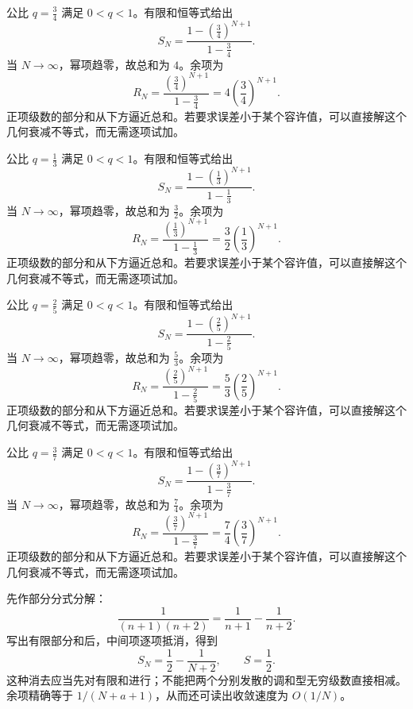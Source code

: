\documentclass[UTF8,12pt,a4paper,fontset=fandol]{ctexart}
\begin{document}
\begin{solve}\label{ans:c24q3}
公比 $q=\frac{3}{4}$ 满足 $0<q<1$。有限和恒等式给出
\[
S_N=\frac{1-(\frac{3}{4})^{N+1}}{1-\frac{3}{4}}.
\]
当 $N\to\infty$，幂项趋零，故总和为 $4$。余项为
\[
R_N=\frac{(\frac{3}{4})^{N+1}}{1-\frac{3}{4}}=4(\frac{3}{4})^{N+1}.
\]
正项级数的部分和从下方逼近总和。若要求误差小于某个容许值，可以直接解这个几何衰减不等式，而无需逐项试加。
\end{solve}

\begin{solve}\label{ans:c24q4}
公比 $q=\frac{1}{3}$ 满足 $0<q<1$。有限和恒等式给出
\[
S_N=\frac{1-(\frac{1}{3})^{N+1}}{1-\frac{1}{3}}.
\]
当 $N\to\infty$，幂项趋零，故总和为 $\frac{3}{2}$。余项为
\[
R_N=\frac{(\frac{1}{3})^{N+1}}{1-\frac{1}{3}}=\frac{3}{2}(\frac{1}{3})^{N+1}.
\]
正项级数的部分和从下方逼近总和。若要求误差小于某个容许值，可以直接解这个几何衰减不等式，而无需逐项试加。
\end{solve}

\begin{solve}\label{ans:c24q5}
公比 $q=\frac{2}{5}$ 满足 $0<q<1$。有限和恒等式给出
\[
S_N=\frac{1-(\frac{2}{5})^{N+1}}{1-\frac{2}{5}}.
\]
当 $N\to\infty$，幂项趋零，故总和为 $\frac{5}{3}$。余项为
\[
R_N=\frac{(\frac{2}{5})^{N+1}}{1-\frac{2}{5}}=\frac{5}{3}(\frac{2}{5})^{N+1}.
\]
正项级数的部分和从下方逼近总和。若要求误差小于某个容许值，可以直接解这个几何衰减不等式，而无需逐项试加。
\end{solve}

\begin{solve}\label{ans:c24q6}
公比 $q=\frac{3}{7}$ 满足 $0<q<1$。有限和恒等式给出
\[
S_N=\frac{1-(\frac{3}{7})^{N+1}}{1-\frac{3}{7}}.
\]
当 $N\to\infty$，幂项趋零，故总和为 $\frac{7}{4}$。余项为
\[
R_N=\frac{(\frac{3}{7})^{N+1}}{1-\frac{3}{7}}=\frac{7}{4}(\frac{3}{7})^{N+1}.
\]
正项级数的部分和从下方逼近总和。若要求误差小于某个容许值，可以直接解这个几何衰减不等式，而无需逐项试加。
\end{solve}

\begin{solve}\label{ans:c24q7}
先作部分分式分解：
\[
\frac1{(n+1)(n+2)}=\frac1{n+1}-\frac1{n+2}.
\]
写出有限部分和后，中间项逐项抵消，得到
\[
S_N=\frac1{2}-\frac1{N+2},\qquad S=\frac{1}{2}.
\]
这种消去应当先对有限和进行；不能把两个分别发散的调和型无穷级数直接相减。余项精确等于 $1/(N+a+1)$，从而还可读出收敛速度为 $O(1/N)$。
\end{solve}
\end{document}
